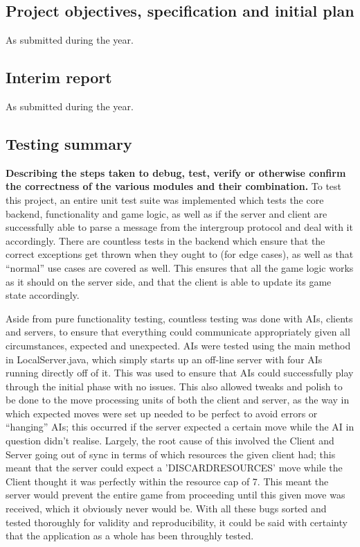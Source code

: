 \documentclass[a4paper,doc,draftfirst]{apa6}
\begin{document}
\begin{appendices}

\subsection{Project objectives, specification and initial plan}
As submitted during the year.




\subsection{Interim report}
As submitted during the year.




\subsection{Testing summary}
\textbf{Describing the steps taken to debug, test, verify or otherwise confirm the correctness of the various modules and their combination.}
To test this project, an entire unit test suite was implemented which tests the core backend, functionality and game logic, as well as if the server and client are successfully able to parse a message from the intergroup protocol and deal with it accordingly. There are countless tests in the backend which ensure that the correct exceptions get thrown when they ought to (for edge cases), as well as that “normal” use cases are covered as well. This ensures that all the game logic works as it should on the server side, and that the client is able to update its game state accordingly.

Aside from pure functionality testing, countless testing was done with AIs, clients and servers, to ensure that everything could communicate appropriately given all circumstances, expected and unexpected. AIs were tested using the main method in LocalServer.java, which simply starts up an off-line server with four AIs running directly off of it. This was used to ensure that AIs could successfully play through the initial phase with no issues. This also allowed tweaks and polish to be done to the move processing units of both the client and server, as the way in which expected moves were set up needed to be perfect to avoid errors or “hanging” AIs; this occurred if the server expected a certain move while the AI in question didn’t realise. Largely, the root cause of this involved the Client and Server going out of sync in terms of which resources the given client had; this meant that the server could expect a 'DISCARDRESOURCES' move while the Client thought it was perfectly within the resource cap of 7. This meant the server would prevent the entire game from proceeding until this given move was received, which it obviously never would be. With all these bugs sorted and tested thoroughly for validity and reproducibility, it could be said with certainty that the application as a whole has been throughly tested.


\end{appendices}
\end{document}
